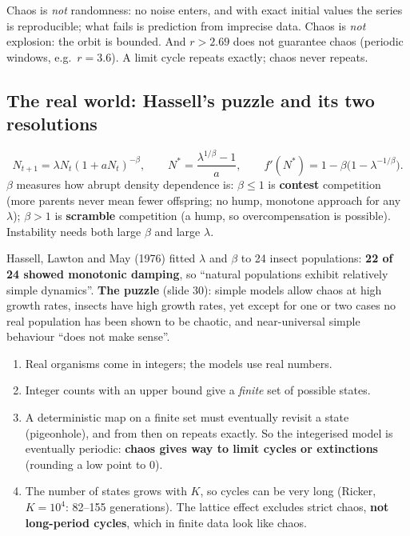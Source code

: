 \begin{trap}
Chaos is \emph{not} randomness: no noise enters, and with exact initial values the series is reproducible; what fails
is prediction from imprecise data. Chaos is \emph{not} explosion: the orbit is bounded. And $r>2.69$ does not
guarantee chaos (periodic windows, e.g.\ $r=3.6$). A limit cycle repeats exactly; chaos never repeats.
\end{trap}

\subsection{The real world: Hassell's puzzle and its two resolutions}
\[
N_{t+1}=\lambda N_t(1+aN_t)^{-\beta},\qquad N^*=\frac{\lambda^{1/\beta}-1}{a},\qquad f'(N^*)=1-\beta\bigl(1-\lambda^{-1/\beta}\bigr).
\]
$\beta$ measures how abrupt density dependence is: $\beta\le1$ is \textbf{contest} competition (more parents never mean
fewer offspring; no hump, monotone approach for any $\lambda$); $\beta>1$ is \textbf{scramble} competition (a hump, so
overcompensation is possible). Instability needs both large $\beta$ and large $\lambda$.

Hassell, Lawton and May (1976) fitted $\lambda$ and $\beta$ to 24 insect populations: \textbf{22 of 24 showed monotonic
damping}, so ``natural populations exhibit relatively simple dynamics''. \textbf{The puzzle} (slide 30): simple models
allow chaos at high growth rates, insects have high growth rates, yet except for one or two cases no real population
has been shown to be chaotic, and near-universal simple behaviour ``does not make sense''.

\begin{chain}
\begin{enumerate}
\item Real organisms come in integers; the models use real numbers.
\item Integer counts with an upper bound give a \emph{finite} set of possible states.
\item A deterministic map on a finite set must eventually revisit a state (pigeonhole), and from then on repeats
exactly. So the integerised model is eventually periodic: \textbf{chaos gives way to limit cycles or extinctions}
(rounding a low point to 0).
\item The number of states grows with $K$, so cycles can be very long (Ricker, $K=10^4$: 82--155 generations). The
lattice effect excludes strict chaos, \textbf{not long-period cycles}, which in finite data look like chaos.
\end{enumerate}
\end{chain}

